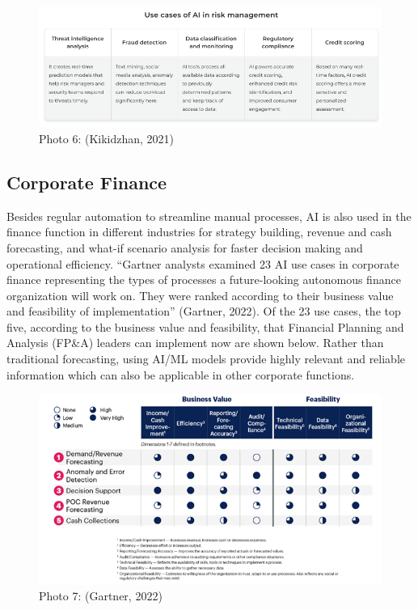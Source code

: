 \documentclass[
]{article}
\begin{document}
\begin{figure}
\centering
\includegraphics{AI_risk.png}
\caption{Photo 6: (Kikidzhan, 2021)}
\end{figure}

\hypertarget{corporate-finance}{%
\subsection{Corporate Finance}\label{corporate-finance}}

Besides regular automation to streamline manual processes, AI is also used in the finance function in different industries for strategy building, revenue and cash forecasting, and what-if scenario analysis for faster decision making and operational efficiency. ``Gartner analysts examined 23 AI use cases in corporate finance representing the types of processes a future-looking autonomous finance organization will work on. They were ranked according to their business value and feasibility of implementation'' (Gartner, 2022). Of the 23 use cases, the top five, according to the business value and feasibility, that Financial Planning and Analysis (FP\&A) leaders can implement now are shown below. Rather than traditional forecasting, using AI/ML models provide highly relevant and reliable information which can also be applicable in other corporate functions.

\begin{figure}
\centering
\includegraphics{financeaiusecases.jpg}
\caption{Photo 7: (Gartner, 2022)}
\end{figure}
\end{document}
